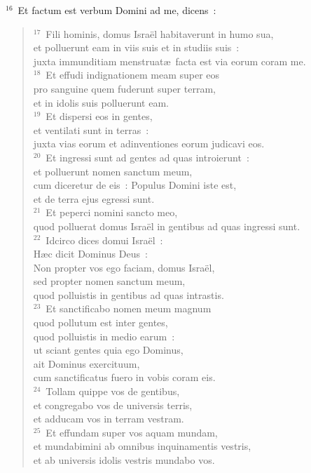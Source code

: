 ${}^{16}$~Et factum est verbum Domini ad me, dicens~:
\begin{verse}${}^{17}$~Fili hominis, domus Isra\"el habitaverunt in humo sua,\\ et polluerunt eam in viis suis et in studiis suis~:\\ juxta immunditiam menstruat\ae\ facta est via eorum coram me.\\
${}^{18}$~Et effudi indignationem meam super eos\\ pro sanguine quem fuderunt super terram,\\ et in idolis suis polluerunt eam.\\
${}^{19}$~Et dispersi eos in gentes,\\ et ventilati sunt in terras~:\\ juxta vias eorum et adinventiones eorum judicavi eos.\\
${}^{20}$~Et ingressi sunt ad gentes ad quas introierunt~:\\ et polluerunt nomen sanctum meum,\\ cum diceretur de eis~: Populus Domini iste est,\\ et de terra ejus egressi sunt.\\
${}^{21}$~Et peperci nomini sancto meo,\\ quod polluerat domus Isra\"el in gentibus ad quas ingressi sunt.\\
${}^{22}$~Idcirco dices domui Isra\"el~:\\ H\ae c dicit Dominus Deus~:\\ Non propter vos ego faciam, domus Isra\"el,\\ sed propter nomen sanctum meum,\\ quod polluistis in gentibus ad quas intrastis.\\
${}^{23}$~Et sanctificabo nomen meum magnum\\ quod pollutum est inter gentes,\\ quod polluistis in medio earum~:\\ ut sciant gentes quia ego Dominus,\\ ait Dominus exercituum,\\ cum sanctificatus fuero in vobis coram eis.\\
${}^{24}$~Tollam quippe vos de gentibus,\\ et congregabo vos de universis terris,\\ et adducam vos in terram vestram.\\
${}^{25}$~Et effundam super vos aquam mundam,\\ et mundabimini ab omnibus inquinamentis vestris,\\ et ab universis idolis vestris mundabo vos.\\

\end{verse}
